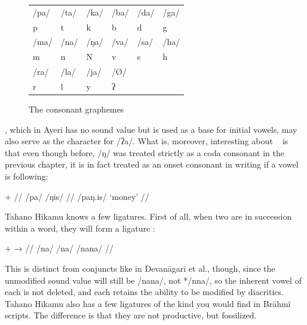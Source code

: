 \begin{figure}[t]
\caption{The consonant graphemes}

\begin{tabu} to \linewidth{X[c] X[c] X[c] X[c] X[c] X[c]}
\toprule
\tableheaderfont	/pa/ & /ta/ & /ka/ & /ba/ & /da/ & /ga/ \\
\rowfont{\Tagati\huge}	p & t & k & b & d & g \\

\midrule

\tableheaderfont	/ma/ & /na/ & /ŋa/ & /va/ & /sa/ & /ha/ \\
\rowfont{\Tagati\huge}	m & n & N & v & s & h \\

\midrule

\tableheaderfont	/ra/ & /la/ & /ja/ & /Ø/ \\
\rowfont{\Tagati\huge}	r & l & y & ʔ \\

\bottomrule
\end{tabu}
\label{fig:thcons}
\end{figure}

, which in Ayeri has no sound value but is used as a base for initial
vowels, may also serve as the character for /ʔa/. What is, moreover,
interesting about ~ is that even though before, /ŋ/ was
treated strictly as a coda consonant in the previous chapter, it is in fact
treated as an onset consonant in writing if a vowel is following:

\ex[lingstyle=thex]\begingl
	\gla {}	$+$	 //
	\glb /pa/	{}	/ŋis/ //
	\glft {} /paŋ.is/ `money' //
\endgl\xe

Tahano Hikamu knows a few ligatures. First of all, when two   
are in succession within a word, they will form a ligature  
:

\ex[lingstyle=thex]\begingl
	\gla {}	$+$		→	 //
	\glb /na/	{}	/na/	{}	/nana/ //
\endgl\xe

\noindent This is distinct from conjuncts like in Devanāgarī et al., though, 
since the unmodified sound value will still be /nana/, not */nna/, so the 
inherent vowel of each   is not deleted, and each  
 retains the ability to be modified by diacritics. Tahano Hikamu also 
has a few ligatures of the kind you would find in Brāhmī scripts. The difference is that they are not productive, but fossilized.

